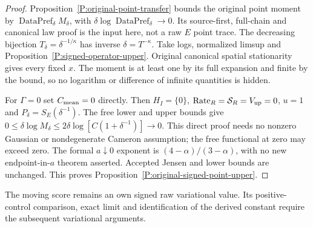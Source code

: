 \begin{proof}
  Proposition~\ref{P:original-point-transfer} bounds the original
  point moment by $\operatorname{DataPref}_\delta M_\delta$,
  with $\delta\log\operatorname{DataPref}_\delta\to0$.
  Its source-first, full-chain and canonical law proof is the input here,
  not a raw $E$ point trace.
  The decreasing bijection $T_\delta=\delta^{-1/\kappa}$ has inverse
  $\delta=T^{-\kappa}$. Take logs, normalized limsup and
  Proposition~\ref{P:signed-operator-upper}.
  Original canonical spatial stationarity gives every fixed $x$.
  The moment is at least one by its full expansion and finite by the bound,
  so no logarithm or difference of infinite quantities is hidden.

  For $\Gamma=0$ set $C_{\rm mean}=0$ directly.
  Then $H_I=\{0\}$, $\operatorname{Rate}_R=\mathcal S_R=V_{\rm up}=0$,
  $u=1$ and $P_\delta=S_E(\delta^{-1})$.
  The free lower and upper bounds give
  $0\le\delta\log M_\delta
  \le2\delta\log[C(1+\delta^{-1})]\to0$.
  This direct proof needs no nonzero Gaussian or nondegenerate
  Cameron assumption; the free functional at zero may exceed zero.
  The formal $a\downarrow0$ exponent is $(4-\alpha)/(3-\alpha)$,
  with no new endpoint-in-$a$ theorem asserted.
  Accepted Jensen and lower bounds are unchanged.
  This proves Proposition~\ref{P:original-signed-point-upper}.
\end{proof}

The moving score remains an own signed raw variational value.
Its positive-control comparison, exact limit and identification of the
derived constant require the subsequent variational arguments.
